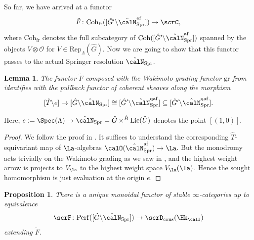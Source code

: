 \documentclass[10pt, reqno]{amsart}
\theoremstyle{plain}
\newtheorem{proposition}[theorem]{Proposition}
\newtheorem{lemma}[theorem]{Lemma}
\theoremstyle{definition}
\numberwithin{equation}{section}
\begin{document}
So far, we have arrived at a functor \begin{equation}
	\tilde{F}\colon\mathrm{Coh}_{\mathrm{fr}}([\hat{G}'\backslash \hat{\calN}_{\mathrm{Spr}}^{\mathrm{af}}]) \to \scrC,
\end{equation} where $\mathrm{Coh}_{\mathrm{fr}}$ denotes the full subcategory of $\mathrm{Coh}([\hat{G}'\backslash \hat{\calN}_{\mathrm{Spr}}^{\mathrm{af}}])$ spanned by the objects $V\otimes \mathcal{O}$ for $V\in \mathrm{Rep}_{\Lambda}(\hat{G})$. Now we are going to show that this functor passes to the actual Springer resolution $\hat{\calN}_{\mathrm{Spr}}$.

\begin{lemma}\label{lem_gr_circ_F_restr}
	The functor $\tilde{F}$ composed with the Wakimoto grading functor $\mathrm{gr}$ from  identifies with the pullback functor of coherent sheaves along the morphism
	\[
	[\hat{T}\backslash e]\to  [\hat{G}\backslash \hat{\calN}_{\mathrm{Spr}}]\cong [\hat{G}'\backslash \hat{\calN}_{\mathrm{Spr}}^{\mathrm{qaf}}]\subseteq [\hat{G}'\backslash \hat{\calN}_{\mathrm{Spr}}^{\mathrm{qaf}}].
	\]
\end{lemma}
Here, $e:=\Spec(\Lambda)\to \hat{\calN}_{\mathrm{Spr}}=\hat{G}\times^{\hat{B}} \mathrm{Lie}(\hat{U})$ denotes the point $[(1,0)]$.
\begin{proof}
	We follow the proof in \cite[Lemma 6.3.8]{AR}. It suffices to understand the corresponding $\hat{T}$-equivariant map of $\La$-algebras $\calO(\hat{\calN}_{\mathrm{Spr}}^{\mathrm{af}})\to \La$. But the monodromy acts trivially on the Wakimoto grading as we saw in , and the highest weight arrow is projects to $V_\la$ to the highest weight space $V_\la(\la)$. Hence the sought homomorphism is just evaluation at the origin $e$.
\end{proof}

\begin{proposition}\label{prop_constr_AB_funct_F}
	There is a unique monoidal functor of stable $\infty$-categories up to equivalence \begin{equation}
		\scrF\colon \mathrm{Perf}([\hat{G}\backslash \hat{\calN}_{\mathrm{Spr}}]) \to \scrD_{\mathrm{cons}}(\Hk_{\calI})
	\end{equation} extending $\tilde{F}$.
\end{proposition}
\end{document}
